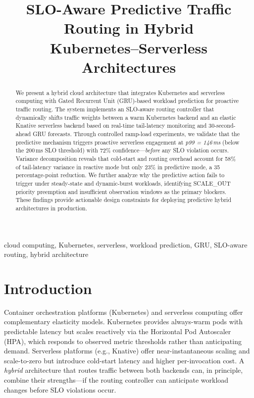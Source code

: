 \documentclass[conference,letterpaper]{IEEEtran}
\begin{document}
\title{SLO-Aware Predictive Traffic Routing in Hybrid\\Kubernetes--Serverless Architectures}

\author{
}

\maketitle

\begin{abstract}
We present a hybrid cloud architecture that integrates Kubernetes and serverless computing with Gated Recurrent Unit (GRU)-based workload prediction for proactive traffic routing. The system implements an SLO-aware routing controller that dynamically shifts traffic weights between a warm Kubernetes backend and an elastic Knative serverless backend based on real-time tail-latency monitoring and 30-second-ahead GRU forecasts. Through controlled ramp-load experiments, we validate that the predictive mechanism triggers proactive serverless engagement at \textit{p99 = 146\,ms} (below the 200\,ms SLO threshold) with 72\% confidence---\textit{before} any SLO violation occurs. Variance decomposition reveals that cold-start and routing overhead account for 58\% of tail-latency variance in reactive mode but only 23\% in predictive mode, a 35 percentage-point reduction. We further analyze why the predictive action fails to trigger under steady-state and dynamic-burst workloads, identifying SCALE\_OUT priority preemption and insufficient observation windows as the primary blockers. These findings provide actionable design constraints for deploying predictive hybrid architectures in production.
\end{abstract}

\begin{IEEEkeywords}
cloud computing, Kubernetes, serverless, workload prediction, GRU, SLO-aware routing, hybrid architecture
\end{IEEEkeywords}

\section{Introduction}

Container orchestration platforms (Kubernetes) and serverless computing offer complementary elasticity models. Kubernetes provides always-warm pods with predictable latency but scales reactively via the Horizontal Pod Autoscaler (HPA), which responds to observed metric thresholds rather than anticipating demand. Serverless platforms (e.g., Knative) offer near-instantaneous scaling and scale-to-zero but introduce cold-start latency and higher per-invocation cost. A \textit{hybrid} architecture that routes traffic between both backends can, in principle, combine their strengths---if the routing controller can anticipate workload changes before SLO violations occur.
\end{document}
